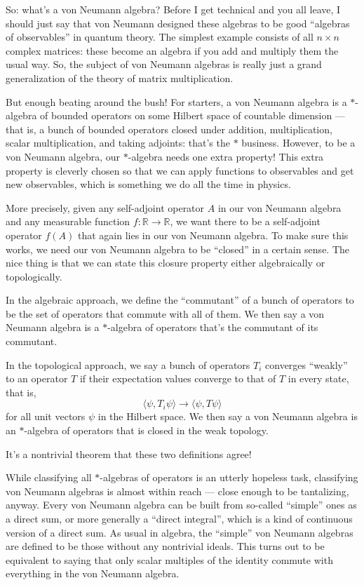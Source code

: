 \documentclass{article}
\begin{document}
So: what's a von Neumann algebra? Before I get technical and you all
leave, I should just say that von Neumann designed these algebras to be
good ``algebras of observables'' in quantum theory. The simplest example
consists of all \(n\times n\) complex matrices: these become an algebra
if you add and multiply them the usual way. So, the subject of von
Neumann algebras is really just a grand generalization of the theory of
matrix multiplication.

But enough beating around the bush! For starters, a von Neumann algebra
is a \(*\)-algebra of bounded operators on some Hilbert space of
countable dimension --- that is, a bunch of bounded operators closed
under addition, multiplication, scalar multiplication, and taking
adjoints: that's the \(*\) business. However, to be a von Neumann
algebra, our \(*\)-algebra needs one extra property! This extra property
is cleverly chosen so that we can apply functions to observables and get
new observables, which is something we do all the time in physics.

More precisely, given any self-adjoint operator \(A\) in our von Neumann
algebra and any measurable function \(f\colon\mathbb{R}\to\mathbb{R}\),
we want there to be a self-adjoint operator \(f(A)\) that again lies in
our von Neumann algebra. To make sure this works, we need our von
Neumann algebra to be ``closed'' in a certain sense. The nice thing is
that we can state this closure property either algebraically or
topologically.

In the algebraic approach, we define the ``commutant'' of a bunch of
operators to be the set of operators that commute with all of them. We
then say a von Neumann algebra is a \(*\)-algebra of operators that's
the commutant of its commutant.

In the topological approach, we say a bunch of operators \(T_i\)
converges ``weakly'' to an operator \(T\) if their expectation values
converge to that of \(T\) in every state, that is,
\[\langle\psi, T_i\psi \rangle \to \langle\psi, T\psi\rangle\] for all
unit vectors \(\psi\) in the Hilbert space. We then say a von Neumann
algebra is an \(*\)-algebra of operators that is closed in the weak
topology.

It's a nontrivial theorem that these two definitions agree!

While classifying all \(*\)-algebras of operators is an utterly hopeless
task, classifying von Neumann algebras is almost within reach --- close
enough to be tantalizing, anyway. Every von Neumann algebra can be built
from so-called ``simple'' ones as a direct sum, or more generally a
``direct integral'', which is a kind of continuous version of a direct
sum. As usual in algebra, the ``simple'' von Neumann algebras are
defined to be those without any nontrivial ideals. This turns out to be
equivalent to saying that only scalar multiples of the identity commute
with everything in the von Neumann algebra.
\end{document}
